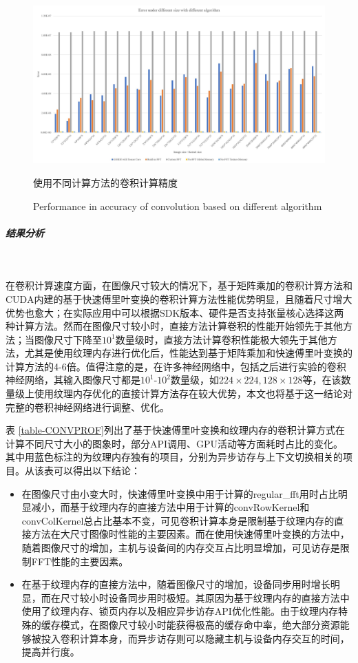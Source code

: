 \begin{figure}
	\centering
	\includegraphics[width=15cm]{figures/CONVError.jpg}
	\renewcommand{\thefigure}{\arabic{section}-\arabic{figure} }
	\renewcommand{\figurename}{图}
	\caption{使用不同计算方法的卷积计算精度}
	\addtocounter{figure}{-1}
	\renewcommand{\thefigure}{\arabic{section}-\arabic{figure} }
	\renewcommand{\figurename}{Figure}
	\caption{Performance in accuracy of convolution based on different algorithm}
	\label{Fig.CONVPr}
\end{figure}
\subparagraph{结果分析}~{}
\par 在卷积计算速度方面，在图像尺寸较大的情况下，基于矩阵乘加的卷积计算方法和CUDA内建的基于快速傅里叶变换的卷积计算方法性能优势明显，且随着尺寸增大优势也愈大；在实际应用中可以根据SDK版本、硬件是否支持张量核心选择这两种计算方法。然而在图像尺寸较小时，直接方法计算卷积的性能开始领先于其他方法；当图像尺寸下降至$ 10^1 $数量级时，直接方法计算卷积性能极大领先于其他方法，尤其是使用纹理内存进行优化后，性能达到基于矩阵乘加和快速傅里叶变换的计算方法的4-6倍。值得注意的是，在许多神经网络中，包括之后进行实验的卷积神经网络，其输入图像尺寸都是$ 10^1 $-$ 10^2 $数量级，如$ 224\times 224, 128\times 128 $等，在该数量级上使用纹理内存优化的直接计算方法存在较大优势，本文也将基于这一结论对完整的卷积神经网络进行调整、优化。
\par 表 \ref{table-CONVPROF}列出了基于快速傅里叶变换和纹理内存的卷积计算方式在计算不同尺寸大小的图象时，部分API调用、GPU活动等方面耗时占比的变化。其中用蓝色标注的为纹理内存独有的项目，分别为异步访存与上下文切换相关的项目。从该表可以得出以下结论：
\begin{itemize}
	\item 在图像尺寸由小变大时，快速傅里叶变换中用于计算的regular\_fft用时占比明显减小，而基于纹理内存的直接方法中用于计算的convRowKernel和convColKernel总占比基本不变，可见卷积计算本身是限制基于纹理内存的直接方法在大尺寸图像时性能的主要因素。而在使用快速傅里叶变换的方法中，随着图像尺寸的增加，主机与设备间的内存交互占比明显增加，可见访存是限制FFT性能的主要因素。
	\item 在基于纹理内存的直接方法中，随着图像尺寸的增加，设备同步用时增长明显，而在尺寸较小时设备同步用时极短。其原因为基于纹理内存的直接方法中使用了纹理内存、锁页内存以及相应异步访存API优化性能。由于纹理内存特殊的缓存模式，在图像尺寸较小时能获得极高的缓存命中率，绝大部分资源能够被投入卷积计算本身，而异步访存则可以隐藏主机与设备内存交互的时间，提高并行度。
\end{itemize}
